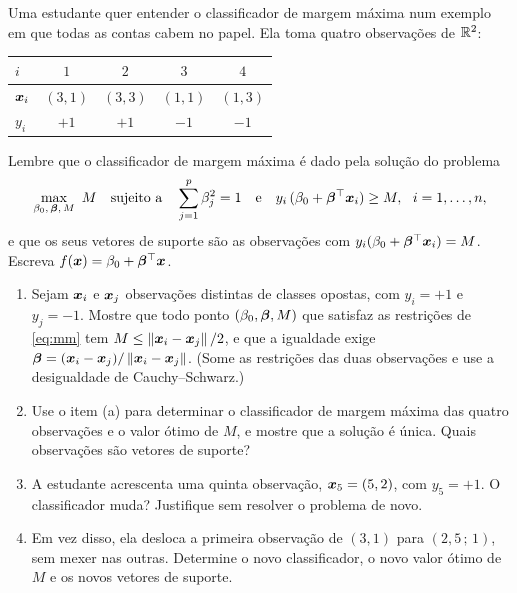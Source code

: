 \documentclass[11pt,a4paper]{article}
\begin{document}

\begin{exercicio}
Uma estudante quer entender o classificador de margem máxima num exemplo em que todas
as contas cabem no papel. Ela toma quatro observações de $\mathbb{R}^2$:
\begin{center}\small
\renewcommand{\arraystretch}{1.2}
\begin{tabular}{@{}lcccc@{}}
\toprule
$i$     & $1$ & $2$ & $3$ & $4$ \\
\midrule
$\bm{x}_i$  & $(3,1)$ & $(3,3)$ & $(1,1)$ & $(1,3)$ \\
$y_i$   & $+1$ & $+1$ & $-1$ & $-1$ \\
\bottomrule
\end{tabular}
\end{center}
Lembre que o classificador de margem máxima é dado pela solução do problema
\begin{equation}\label{eq:mm}
  \max_{\beta_0,\,\bm{\beta},\,M}\ M
  \quad\text{sujeito a}\quad
  \sum_{j=1}^p\beta_j^2=1
  \quad\text{e}\quad
  y_i\,(\beta_0+\bm{\beta}^\top\bm{x}_i)\ge M,\ \ i=1,\dots,n,
\end{equation}
e que os seus vetores de suporte são as observações com
$y_i(\beta_0+\bm{\beta}^\top\bm{x}_i)=M$. Escreva $f(\bm{x})=\beta_0+\bm{\beta}^\top\bm{x}$.
\begin{enumerate}[label=(\alph*),leftmargin=1.1cm]
  \item Sejam $\bm{x}_i$ e $\bm{x}_j$ observações distintas de classes opostas, com $y_i=+1$
        e $y_j=-1$. Mostre que todo ponto $(\beta_0,\bm{\beta},M)$ que satisfaz as
        restrições de \eqref{eq:mm} tem $M\le\left\lVert \bm{x}_i-\bm{x}_j \right\rVert/2$, e que a igualdade
        exige $\bm{\beta}=(\bm{x}_i-\bm{x}_j)/\left\lVert \bm{x}_i-\bm{x}_j \right\rVert$. (Some as restrições das duas
        observações e use a desigualdade de Cauchy--Schwarz.)
  \item Use o item (a) para determinar o classificador de margem máxima das quatro
        observações e o valor ótimo de $M$, e mostre que a solução é única. Quais
        observações são vetores de suporte?
  \item A estudante acrescenta uma quinta observação, $\bm{x}_5=(5,2)$, com $y_5=+1$. O
        classificador muda? Justifique sem resolver o problema de novo.
  \item Em vez disso, ela desloca a primeira observação de $(3,1)$ para
        $(2{,}5\,;\,1)$, sem mexer nas outras. Determine o novo classificador, o novo
        valor ótimo de $M$ e os novos vetores de suporte.
\end{enumerate}
\end{exercicio}
\end{document}
